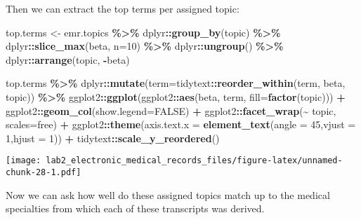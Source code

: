 \documentclass[
]{article}
\newenvironment{Shaded}{\begin{snugshade}}{\end{snugshade}}
\newcommand{\AttributeTok}[1]{\textcolor[rgb]{0.13,0.29,0.53}{#1}}
\newcommand{\ConstantTok}[1]{\textcolor[rgb]{0.56,0.35,0.01}{#1}}
\newcommand{\DecValTok}[1]{\textcolor[rgb]{0.00,0.00,0.81}{#1}}
\newcommand{\FunctionTok}[1]{\textcolor[rgb]{0.13,0.29,0.53}{\textbf{#1}}}
\newcommand{\NormalTok}[1]{#1}
\newcommand{\OtherTok}[1]{\textcolor[rgb]{0.56,0.35,0.01}{#1}}
\newcommand{\SpecialCharTok}[1]{\textcolor[rgb]{0.81,0.36,0.00}{\textbf{#1}}}
\newcommand{\StringTok}[1]{\textcolor[rgb]{0.31,0.60,0.02}{#1}}
\begin{document}
Then we can extract the top terms per assigned topic:

\begin{Shaded}
\begin{Highlighting}[]
\NormalTok{top.terms }\OtherTok{\textless{}{-}}\NormalTok{ emr.topics }\SpecialCharTok{\%\textgreater{}\%}\NormalTok{ dplyr}\SpecialCharTok{::}\FunctionTok{group\_by}\NormalTok{(topic) }\SpecialCharTok{\%\textgreater{}\%} 
\NormalTok{  dplyr}\SpecialCharTok{::}\FunctionTok{slice\_max}\NormalTok{(beta, }\AttributeTok{n=}\DecValTok{10}\NormalTok{) }\SpecialCharTok{\%\textgreater{}\%}
\NormalTok{  dplyr}\SpecialCharTok{::}\FunctionTok{ungroup}\NormalTok{() }\SpecialCharTok{\%\textgreater{}\%}
\NormalTok{  dplyr}\SpecialCharTok{::}\FunctionTok{arrange}\NormalTok{(topic, }\SpecialCharTok{{-}}\NormalTok{beta)}


\NormalTok{top.terms }\SpecialCharTok{\%\textgreater{}\%} 
\NormalTok{  dplyr}\SpecialCharTok{::}\FunctionTok{mutate}\NormalTok{(}\AttributeTok{term=}\NormalTok{tidytext}\SpecialCharTok{::}\FunctionTok{reorder\_within}\NormalTok{(term, beta, topic)) }\SpecialCharTok{\%\textgreater{}\%} 
\NormalTok{  ggplot2}\SpecialCharTok{::}\FunctionTok{ggplot}\NormalTok{(ggplot2}\SpecialCharTok{::}\FunctionTok{aes}\NormalTok{(beta, term, }\AttributeTok{fill=}\FunctionTok{factor}\NormalTok{(topic))) }\SpecialCharTok{+} 
\NormalTok{    ggplot2}\SpecialCharTok{::}\FunctionTok{geom\_col}\NormalTok{(}\AttributeTok{show.legend=}\ConstantTok{FALSE}\NormalTok{) }\SpecialCharTok{+} 
\NormalTok{    ggplot2}\SpecialCharTok{::}\FunctionTok{facet\_wrap}\NormalTok{(}\SpecialCharTok{\textasciitilde{}}\NormalTok{ topic, }\AttributeTok{scales=}\StringTok{\textquotesingle{}free\textquotesingle{}}\NormalTok{)  }\SpecialCharTok{+}
\NormalTok{    ggplot2}\SpecialCharTok{::}\FunctionTok{theme}\NormalTok{(}\AttributeTok{axis.text.x =} \FunctionTok{element\_text}\NormalTok{(}\AttributeTok{angle =} \DecValTok{45}\NormalTok{,}\AttributeTok{vjust =} \DecValTok{1}\NormalTok{,}\AttributeTok{hjust =} \DecValTok{1}\NormalTok{)) }\SpecialCharTok{+}
\NormalTok{    tidytext}\SpecialCharTok{::}\FunctionTok{scale\_y\_reordered}\NormalTok{()}
\end{Highlighting}
\end{Shaded}

\texttt{[image: lab2\_electronic\_medical\_records\_files/figure-latex/unnamed-chunk-28-1.pdf]}

Now we can ask how well do these assigned topics match up to the medical
specialties from which each of these transcripts was derived.
\end{document}
